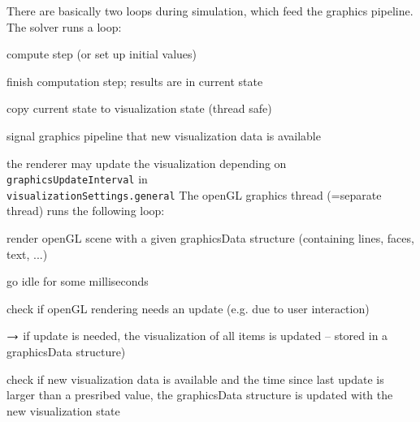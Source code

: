 There are basically two loops during simulation, which feed the graphics pipeline.
The solver runs a loop:
\bi
  \item compute step (or set up initial values)
  \item finish computation step; results are in current state
  \item copy current state to visualization state (thread safe)
  \item signal graphics pipeline that new visualization data is available
  \item the renderer may update the visualization depending on \texttt{graphicsUpdateInterval} in \\ \texttt{visualizationSettings.general}
\ei
The openGL graphics thread (=separate thread) runs the following loop:
\bi
  \item render openGL scene with a given graphicsData structure (containing lines, faces, text, ...)
  \item go idle for some milliseconds
  \item check if openGL rendering needs an update (e.g. due to user interaction)
  \item[] $\rightarrow$ if update is needed, the visualization of all items is updated -- stored in a graphicsData structure)
  \item check if new visualization data is available and the time since last update is larger than a presribed value, the graphicsData structure is updated with the new visualization state
\ei


